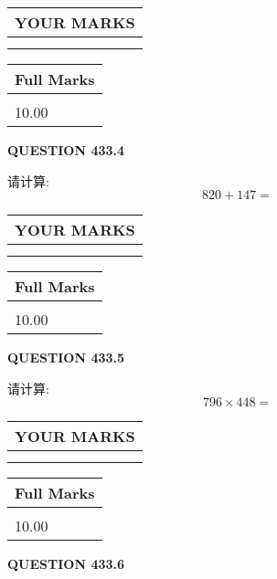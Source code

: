 \documentclass{ctexart}
\begin{document}
\noindent\begin{tabular}{|l|}
\hline
 YOUR MARKS  \\
\hline
 \\ 
 \\ 
\hline
\end{tabular}
\hspace{0.05in} \begin{tabular}{|l|}
\hline
 Full Marks  \\
\hline
 \\ 
10.00 \\
\hline
\end{tabular}
{\textbf{\Large{QUESTION
433.4 
}}}
  
  
 
请计算:
\begin{equation}
820 +  %
147 = \nonumber
\end{equation}
 

 

 
  
\vspace{0.2in}
  
\noindent\begin{tabular}{|l|}
\hline
 YOUR MARKS  \\
\hline
 \\ 
 \\ 
\hline
\end{tabular}
\hspace{0.05in} \begin{tabular}{|l|}
\hline
 Full Marks  \\
\hline
 \\ 
10.00 \\
\hline
\end{tabular}
{\textbf{\Large{QUESTION
433.5 
}}}
  
  
 
请计算:
\begin{equation}
796  \times    %
448 = \nonumber
\end{equation}
 

 

 
  
\vspace{0.2in}
  
\noindent\begin{tabular}{|l|}
\hline
 YOUR MARKS  \\
\hline
 \\ 
 \\ 
\hline
\end{tabular}
\hspace{0.05in} \begin{tabular}{|l|}
\hline
 Full Marks  \\
\hline
 \\ 
10.00 \\
\hline
\end{tabular}
{\textbf{\Large{QUESTION
433.6 
}}}
  
\end{document}
